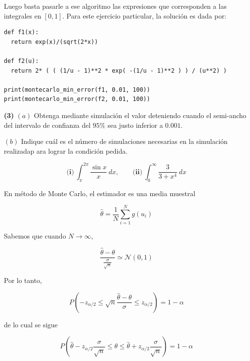 \documentclass[a4paper, 12pt]{article}
\begin{document}
Luego basta pasarle a ese algoritmo las expresiones que corresponden a las
integrales en $[0, 1]$. Para este ejercicio particular, la solución es dada por: 

\begin{verbatim}
def f1(x): 
  return exp(x)/(sqrt(2*x))

def f2(u): 
  return 2* ( ( (1/u - 1)**2 * exp( -(1/u - 1)**2 ) ) / (u**2) )

print(montecarlo_min_error(f1, 0.01, 100))
print(montecarlo_min_error(f2, 0.01, 100))

\end{verbatim}

\pagebreak 

\begin{myframe}
    \textbf{(3)} $(a)$ Obtenga mediante simulación el valor deteniendo cuando el semi-ancho
    del intervalo de confianza del $95\%$ sea justo inferior a $0.001$.

    $(b)$ Indique cuál es el número de simulaciones necesarias en la simulación
    realizadap ara lograr la condición pedida.

    \begin{equation*}
        \textbf{(i)} ~ \int_{\pi}^{2\pi} \frac{\sin x}{x} ~ dx, \qquad
        \textbf{(ii)} ~ \int_0^\infty \frac{3}{3+x^4} ~  dx
    \end{equation*}
\end{myframe}

En método de Monte Carlo, el estimador es una media muestral 

$$\hat{\theta} = \frac{1}{N} \sum_{i=1}^N g(u_i)$$

Sabemos que cuando $N \to \infty$, 

\begin{equation*}
    \frac{ \hat{\theta} -  \theta }{\frac{\sigma}{\sqrt{n} }} \simeq
    \mathcal{N}(0, 1)
\end{equation*}

Por lo tanto, 

\begin{equation*}
    P\left( -z_{\alpha / 2} \leq \sqrt{n} \frac{\hat{\theta} - \theta}{\sigma}
    \leq z_{\alpha / 2}\right)  = 1-\alpha
\end{equation*}

de lo cual se sigue

\begin{equation*}
    P\left( \hat{\theta} - z_{\alpha / 2} \frac{\sigma}{\sqrt{n} }  \leq \theta \leq
        \hat{\theta} + z_{\alpha /
        2}
    \frac{\sigma}{\sqrt{n} }  \right)  = 1 - \alpha
\end{equation*}
\end{document}
